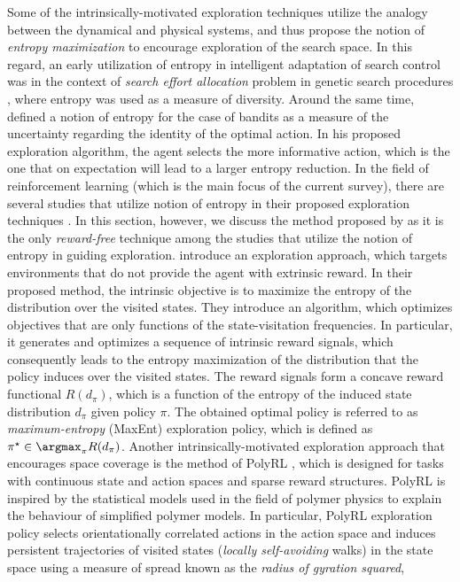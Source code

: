 Some of the intrinsically-motivated exploration techniques utilize the analogy between the dynamical and physical systems, and thus propose the notion of \emph{entropy maximization} to encourage exploration of the search space. In this regard, an early utilization of entropy in intelligent adaptation of search control was in the context of \emph{search effort allocation} problem in genetic search procedures , where entropy was used as a measure of diversity. Around the same time,  defined a notion of entropy for the case of bandits as a measure of the uncertainty regarding the identity of the optimal action. In his proposed exploration algorithm, the agent selects the more informative action, which is the one that on expectation will lead to a larger entropy reduction. In the field of reinforcement learning (which is the main focus of the current survey), there are several studies that utilize notion of entropy in their proposed exploration techniques . In this section, however, we discuss the method proposed by  as it is the only \emph{reward-free} technique among the studies that utilize the notion of entropy in guiding exploration.  introduce an exploration approach, which targets environments that do not provide the agent with extrinsic reward. In their proposed method, the intrinsic objective is to maximize the entropy of the distribution over the visited states. They introduce an algorithm, which optimizes objectives that are only functions of the state-visitation frequencies. In particular, it generates and optimizes a sequence of intrinsic reward signals, which consequently leads to the entropy maximization of the distribution that the policy induces over the visited states. The reward signals form a concave reward functional $R(d_\pi)$, which is a function of the entropy of the induced state distribution $d_\pi$ given policy $\pi$. The obtained optimal policy is referred to as \emph{maximum-entropy} (MaxEnt) exploration policy, which is defined as $\pi^\star \in \argmax_{\pi} R(d_\pi)$.
Another intrinsically-motivated exploration approach that encourages space coverage is the method of PolyRL , which is designed for tasks with continuous state and action spaces and sparse reward structures. PolyRL is inspired by the statistical models used in the field of polymer physics to explain the behaviour of simplified polymer models. In particular, PolyRL exploration policy selects orientationally correlated actions in the action space and induces persistent trajectories of visited states (\emph{locally self-avoiding} walks) in the state space using a measure of spread known as the \emph{radius of gyration squared},
